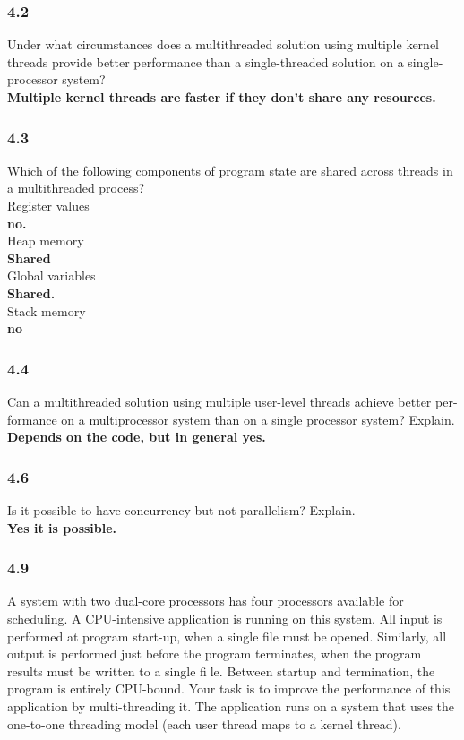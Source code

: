 \documentclass[a4paper,10pt,titlepage]{report}
\begin{document}
\subsubsection{4.2}
Under what circumstances does a multithreaded solution using multiple kernel threads provide better performance than a single-threaded solution on a single-processor system?\\
\textbf{Multiple kernel threads are faster if they don't share any resources.} \\ \vspace{5mm}
\subsubsection{4.3}
Which of the following components of program state are shared across threads in a multithreaded process?\\

Register values\\
\textbf{no.} \\
Heap memory\\
\textbf{Shared }\\
Global variables\\
\textbf{Shared.} \\
Stack memory\\
\textbf{no} \\ \vspace{5mm}
\subsubsection{4.4}
Can a multithreaded solution using multiple user-level threads achieve better per- formance on a multiprocessor system than on a single processor system? Explain.\\
\textbf{Depends on the code, but in general yes.}\\ \vspace{5mm}
\subsubsection{4.6}
Is it possible to have concurrency but not parallelism? Explain.\\
\textbf{Yes it is possible.}\\ \vspace{5mm}

\subsubsection{4.9}
A system with two dual-core processors has four processors available for scheduling. A CPU-intensive application is running on this system. All input is performed at program start-up, when a single file must be opened. Similarly, all output is performed just before the program terminates, when the program results must be written to a single file. Between startup and termination, the program is entirely CPU-bound. Your task is to improve the performance of this application by multi-threading it. The application runs on a system that uses the one-to-one threading model (each user thread maps to a kernel thread).\\
\end{document}
